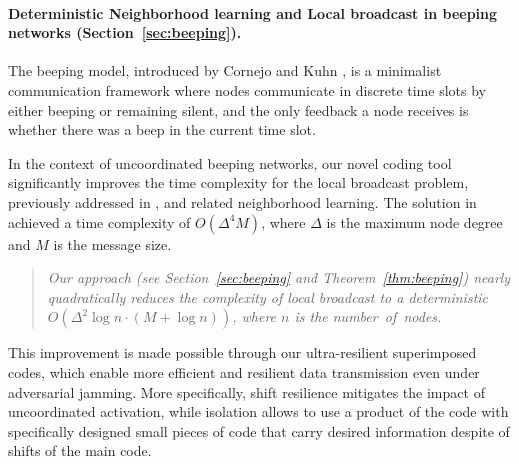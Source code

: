\documentclass[11pt]{article}
\begin{document}
\B
\paragraph*{Deterministic Neighborhood learning and Local broadcast in beeping networks (Section~\ref{sec:beeping}).}
The beeping model, introduced by Cornejo and Kuhn \cite{CornejoK10}, 
is a minimalist communication framework where nodes communicate in discrete time slots by 
either beeping or remaining silent, and the only feedback a node receives is whether there 
was a beep in the current time slot.

In the context of uncoordinated beeping networks, our novel coding tool significantly improves the time 
complexity for the local broadcast problem, previously addressed in \cite{DBB2020}, and related neighborhood learning. The 
solution in \cite{DBB2020} achieved a time complexity of $O(\Delta^4 M)$, where $\Delta$ is the maximum node degree and 
$M$ is the message size. 

\vspace*{-1ex}
\begin{quote}
{\em Our approach (see Section~\ref{sec:beeping} and Theorem~\ref{thm:beeping}) nearly quadratically reduces the complexity of local broadcast to a deterministic 
$O(\Delta^2 \log n \cdot (M + \log n))$, where $n$ is the number~of~nodes.} 
\end{quote}

\vspace*{-1ex}
\noindent
This improvement is made 
possible through our ultra-resilient superimposed codes, which enable more efficient and resilient 
data transmission even under adversarial jamming. More specifically, shift resilience mitigates the impact of uncoordinated activation, while isolation allows to use a product of the code with specifically designed small pieces of code that carry desired information despite of shifts of the main code.


\B
\end{document}
